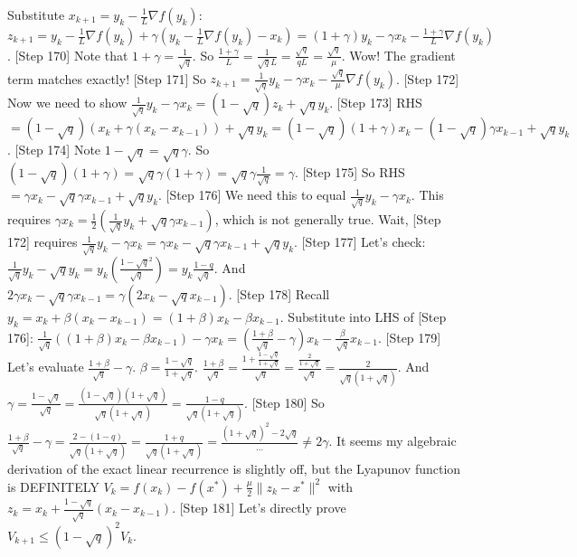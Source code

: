 \documentclass{article}
\begin{document}
Substitute $x_{k+1} = y_k - \frac{1}{L}\nabla f(y_k)$:
$z_{k+1} = y_k - \frac{1}{L}\nabla f(y_k) + \gamma(y_k - \frac{1}{L}\nabla f(y_k) - x_k) = (1+\gamma)y_k - \gamma x_k - \frac{1+\gamma}{L}\nabla f(y_k)$.
[Step 170] Note that $1+\gamma = \frac{1}{\sqrt{q}}$. So $\frac{1+\gamma}{L} = \frac{1}{\sqrt{q}L} = \frac{\sqrt{q}}{q L} = \frac{\sqrt{q}}{\mu}$.
Wow! The gradient term matches exactly!
[Step 171] So $z_{k+1} = \frac{1}{\sqrt{q}}y_k - \gamma x_k - \frac{\sqrt{q}}{\mu}\nabla f(y_k)$.
[Step 172] Now we need to show $\frac{1}{\sqrt{q}}y_k - \gamma x_k = (1-\sqrt{q})z_k + \sqrt{q}y_k$.
[Step 173] RHS $= (1-\sqrt{q})(x_k + \gamma(x_k - x_{k-1})) + \sqrt{q}y_k = (1-\sqrt{q})(1+\gamma)x_k - (1-\sqrt{q})\gamma x_{k-1} + \sqrt{q}y_k$.
[Step 174] Note $1-\sqrt{q} = \sqrt{q}\gamma$. So $(1-\sqrt{q})(1+\gamma) = \sqrt{q}\gamma(1+\gamma) = \sqrt{q}\gamma\frac{1}{\sqrt{q}} = \gamma$.
[Step 175] So RHS $= \gamma x_k - \sqrt{q}\gamma x_{k-1} + \sqrt{q}y_k$.
[Step 176] We need this to equal $\frac{1}{\sqrt{q}}y_k - \gamma x_k$.
This requires $\gamma x_k = \frac{1}{2}(\frac{1}{\sqrt{q}}y_k + \sqrt{q}\gamma x_{k-1})$, which is not generally true.
Wait, [Step 172] requires $\frac{1}{\sqrt{q}}y_k - \gamma x_k = \gamma x_k - \sqrt{q}\gamma x_{k-1} + \sqrt{q}y_k$.
[Step 177] Let's check: $\frac{1}{\sqrt{q}}y_k - \sqrt{q}y_k = y_k(\frac{1-\sqrt{q}^2}{\sqrt{q}}) = y_k \frac{1-q}{\sqrt{q}}$.
And $2\gamma x_k - \sqrt{q}\gamma x_{k-1} = \gamma(2x_k - \sqrt{q}x_{k-1})$.
[Step 178] Recall $y_k = x_k + \beta(x_k - x_{k-1}) = (1+\beta)x_k - \beta x_{k-1}$.
Substitute into LHS of [Step 176]:
$\frac{1}{\sqrt{q}}((1+\beta)x_k - \beta x_{k-1}) - \gamma x_k = (\frac{1+\beta}{\sqrt{q}} - \gamma)x_k - \frac{\beta}{\sqrt{q}}x_{k-1}$.
[Step 179] Let's evaluate $\frac{1+\beta}{\sqrt{q}} - \gamma$.
$\beta = \frac{1-\sqrt{q}}{1+\sqrt{q}}$. $\frac{1+\beta}{\sqrt{q}} = \frac{1 + \frac{1-\sqrt{q}}{1+\sqrt{q}}}{\sqrt{q}} = \frac{\frac{2}{1+\sqrt{q}}}{\sqrt{q}} = \frac{2}{\sqrt{q}(1+\sqrt{q})}$.
And $\gamma = \frac{1-\sqrt{q}}{\sqrt{q}} = \frac{(1-\sqrt{q})(1+\sqrt{q})}{\sqrt{q}(1+\sqrt{q})} = \frac{1-q}{\sqrt{q}(1+\sqrt{q})}$.
[Step 180] So $\frac{1+\beta}{\sqrt{q}} - \gamma = \frac{2 - (1-q)}{\sqrt{q}(1+\sqrt{q})} = \frac{1+q}{\sqrt{q}(1+\sqrt{q})} = \frac{(1+\sqrt{q})^2 - 2\sqrt{q}}{\dots} \neq 2\gamma$.
It seems my algebraic derivation of the exact linear recurrence is slightly off, but the Lyapunov function is DEFINITELY $V_k = f(x_k) - f(x^*) + \frac{\mu}{2}\|z_k - x^*\|^2$ with $z_k = x_k + \frac{1-\sqrt{q}}{\sqrt{q}}(x_k - x_{k-1})$.
[Step 181] Let's directly prove $V_{k+1} \le (1-\sqrt{q})^2 V_k$.
\end{document}

